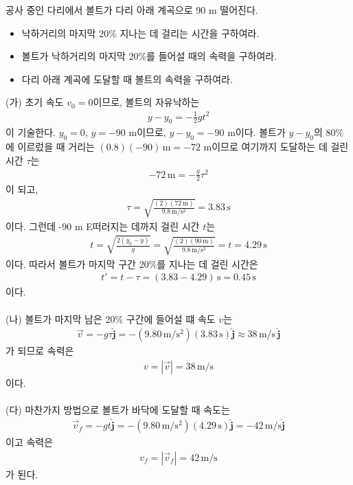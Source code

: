 \documentclass[APS,floatfix,nofootinbib,superscriptaddress,fleqn,preprint]{revtex4}
\begin{document}
공사 중인 다리에서 볼트가 다리 아래 계곡으로 90 m 떨어진다.
\begin{itemize}
\item[(가)] 낙하거리의 마지막 20\% 지나는 데 걸리는 시간을 구하여라.
\item[(나)] 볼트가 낙하거리의 마지막 20\%를 들어설 때의 속력을
  구하여라.
\item[(다)] 다리 아래 계곡에 도달할 때 볼트의 속력을 구하여라.   
\end{itemize} 
(가) 초기 속도 $v_0=0$이므로, 볼트의 자유낙하는
\begin{align*}
y-y_0= -\frac12 gt^2  
\end{align*}
이 기술한다. $y_0=0$, $y=-90$ m이므로, $y-y_0=-90$ m이다. 볼트가
$y-y_0$의 80\%에 이르렀을 때 거리는 $(0.8)(-90)\, \mathrm{m}= -72$
m이므로  여기까지 도달하는 데 걸린 시간 $\tau$는 
\begin{align*}
-72\,\mathrm{m} = -\frac{g}{2} \tau^2  
\end{align*}
이 되고,
\begin{align*}
\tau = \sqrt{\frac{(2) (72\,\mathrm{m})}{9.8\,\mathrm{m/s^2}}} =
  3.83\,\mathrm{s} 
\end{align*}
이다. 그런데 -90 m E떠러지는 데까지 걸린 시간 $t$는
\begin{align*}
t = \sqrt{\frac{2(y_0-y)}{g}} = \sqrt{\frac{(2) (90\,\mathrm
  m)}{9.8\,\mathrm{m/s^2}}} = t = 4.29\,\mathrm{s}  
\end{align*}
이다. 따라서 볼트가 마지막 구간 20\%를 지나는 데 걸린 시간은
\begin{align*}
t' = t-\tau = (3.83-4.29)\,\mathrm{s} = 0.45\,\mathrm{s} 
\end{align*}
이다.
\\
\\
\noindent (나) 볼트가 마지막 남은 20\% 구간에 들어설 떄 속도 $v$는
\begin{align*}
\vec{v} = -g\tau\hat{\bm{j}} =
  -(9.80\,\mathrm{m/s^2})(3.83\,\mathrm{s})\hat{\bm{j}} \approx 
  38\,\mathrm{m/s}   \,\hat{\bm{j}}  
\end{align*}
가 되므로 속력은
\begin{align*}
  v = |\vec{v}| = 38\,\mathrm{m/s} 
\end{align*}
이다. 
\\
\\
\noindent (다)
마찬가지 방법으로 볼트가 바닥에 도달할 때 속도는 
\begin{align*}
  \vec{v}_f = -gt \hat{\bm{j}}  =
  -(9.80\,\mathrm{m/s^2})(4.29\,\mathrm{s}) \hat{\bm{j}}
  =-42\,\mathrm{m/s} \hat{\bm{j}}
\end{align*}
이고 속력은
\begin{align*}
v_f = |\vec{v}_f| = 42\, \mathrm{m/s}  
\end{align*}
가 된다.   
\end{document}
